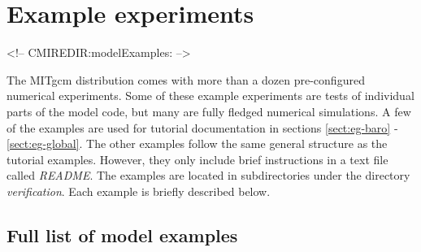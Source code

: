\section[MITgcm Example Experiments]{Example experiments}
\label{sect:modelExamples}
\begin{rawhtml}
<!-- CMIREDIR:modelExamples: -->
\end{rawhtml}


The MITgcm distribution comes with more than a dozen pre-configured
numerical experiments. Some of these example experiments are tests of
individual parts of the model code, but many are fully fledged
numerical simulations. A few of the examples are used for tutorial
documentation in sections \ref{sect:eg-baro} - \ref{sect:eg-global}.
The other examples follow the same general structure as the tutorial
examples. However, they only include brief instructions in a text file
called {\it README}.  The examples are located in subdirectories under
the directory \textit{verification}. Each example is briefly described
below.

\subsection{Full list of model examples}

